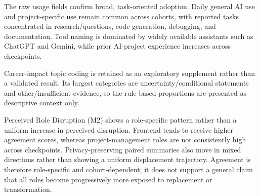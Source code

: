 
The raw usage fields confirm broad, task-oriented adoption. Daily general AI
use and project-specific use remain common across cohorts, with reported tasks
concentrated in research/questions, code generation, debugging, and
documentation. Tool naming is dominated by widely available assistants such as
ChatGPT and Gemini, while prior AI-project experience increases across
checkpoints.

Career-impact topic coding is retained as an exploratory supplement rather
than a validated result. Its largest categories are uncertainty/conditional
statements and other/insufficient evidence, so the rule-based proportions are
presented as descriptive context only.

Perceived Role Disruption (M2) shows a role-specific pattern rather than a
uniform increase in perceived disruption. Frontend tends to receive higher
agreement scores, whereas project-management roles are not consistently high
across checkpoints. Privacy-preserving paired summaries also move in mixed
directions rather than showing a uniform displacement trajectory. Agreement is
therefore role-specific and cohort-dependent; it does not support a general
claim that all roles become progressively more exposed to replacement or
transformation.

